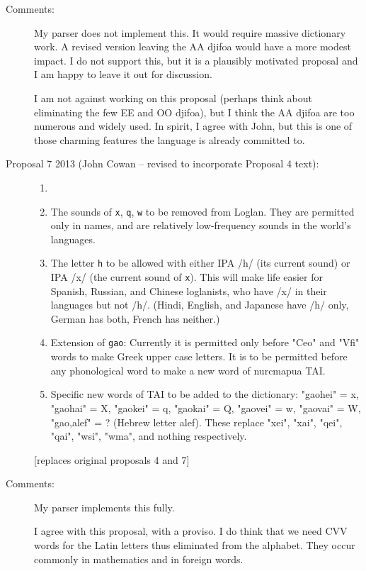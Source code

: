 \documentclass[12pt]{article}
\begin{document}
\begin{description}
\item[Comments:]  My parser does not implement this. 
 It would require massive dictionary work.  
A revised version leaving the AA djifoa 
would have a more modest impact.  I do not support this, but it is a plausibly motivated proposal and I am happy to leave it out for discussion.

I am not against working on this proposal (perhaps think about eliminating the few EE and OO djifoa), but I think the AA djifoa are too numerous and widely used.  In spirit, I agree
with John, but this is one of those charming features the language is already committed to.


\item[Proposal 7 2013 (John Cowan -- revised to incorporate Proposal 4 text):]

\begin{enumerate}
\item[]


\item  The sounds of {\tt x}, {\tt q},  {\tt w} to be removed from Loglan.  They are
permitted only in names, and are relatively low-frequency sounds in the
world's languages.

\item The letter {\tt h} to be allowed with either IPA /h/ (its current sound)
or IPA /x/ (the current sound of {\tt x}).  This will make life easier
for Spanish, Russian, and Chinese loglanists, who have /x/ in their
languages but not /h/.  (Hindi, English, and Japanese have /h/ only,
German has both, French has neither.)

\item  Extension of {\tt gao}:  Currently it is permitted only before "Ceo"
and "Vfi" words to make Greek upper case letters.  It is to be permitted
before any phonological word to make a new word of nurcmapua TAI.

\item Specific new words of TAI to be added to the dictionary:  "gaohei" =
x, "gaohai" = X, "gaokei" = q, "gaokai" = Q, "gaovei" = w, "gaovai" = W,
"gao,alef" = ? (Hebrew letter alef).  These replace "xei", "xai", "qei",
"qai", "wsi", "wma", and nothing respectively.

\end{enumerate}
[replaces original proposals 4 and 7]

\item[Comments:]  My parser implements this fully.

I agree with this proposal, with a proviso.  I do think that we need CVV words for the Latin
letters thus eliminated from the alphabet.   They occur commonly in mathematics and in foreign words.


\end{description}
\end{document}
